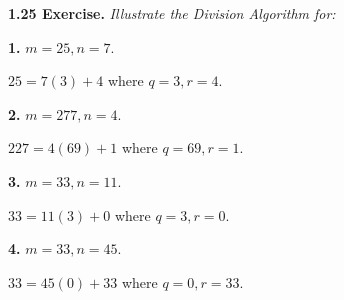 \documentclass[12pt]{article}
\begin{document}
\noindent\textbf{1.25 Exercise.} \textit{Illustrate the Division Algorithm for:}

\bigskip
\noindent\textbf{1.} $m=25, n=7$.

\bigskip
$25=7(3)+4$ where $q=3, r=4$. 

\bigskip
\noindent\textbf{2.} $m=277, n=4$.

\bigskip
$227=4(69)+1$ where $q=69, r=1$. 

\bigskip
\noindent\textbf{3.} $m=33, n=11$.

\bigskip
$33=11(3)+0$ where $q=3, r=0$. 

\bigskip
\noindent\textbf{4.} $m=33, n=45$.

\bigskip
$33=45(0)+33$ where $q=0, r=33$. 
\end{document}
